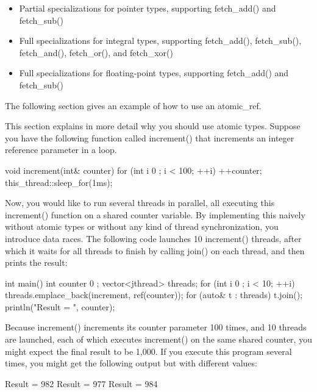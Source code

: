 \begin{itemize}
\item
Partial specializations for pointer types, supporting fetch\_add() and fetch\_sub()

\item
Full specializations for integral types, supporting fetch\_add(), fetch\_sub(), fetch\_and(), fetch\_or(), and fetch\_xor()

\item
Full specializations for floating-point types, supporting fetch\_add() and fetch\_sub()
\end{itemize}

The following section gives an example of how to use an atomic\_ref.


This section explains in more detail why you should use atomic types. Suppose you have the following function called increment() that increments an integer reference parameter in a loop.

\begin{cpp}
void increment(int& counter)
{
    for (int i { 0 }; i < 100; ++i) {
        ++counter;
        this_thread::sleep_for(1ms);
    }
}
\end{cpp}

Now, you would like to run several threads in parallel, all executing this increment() function on a shared counter variable. By implementing this naively without atomic types or without any kind of thread synchronization, you introduce data races. The following code launches 10 increment() threads, after which it waits for all threads to finish by calling join() on each thread, and then prints the result:

\begin{cpp}
int main()
{
    int counter { 0 };
    vector<jthread> threads;
    for (int i { 0 }; i < 10; ++i) {
        threads.emplace_back(increment, ref(counter));
    }
    for (auto& t : threads) { t.join(); }
    println("Result = {}", counter);
}
\end{cpp}

Because increment() increments its counter parameter 100 times, and 10 threads are launched, each of which executes increment() on the same shared counter, you might expect the final result to be 1,000. If you execute this program several times, you might get the following output but with different values:

\begin{shell}
Result = 982
Result = 977
Result = 984
\end{shell}

